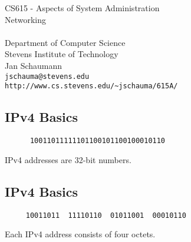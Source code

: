 \documentclass[xga]{xdvislides}
\begin{document}
\setfontphv

\lhead{\slidetitle}                               %
\cfoot{\relax}                               %
\rfoot{\Gray{\today}}

\vspace*{\fill}
\begin{center}
	\Hugesize
		CS615 - Aspects of System Administration\\ [1em]
		Networking\\ [1em]
	\hspace*{5mm}\blueline\\ [1em]
	\Normalsize
		Department of Computer Science\\
		Stevens Institute of Technology\\
		Jan Schaumann\\
		\verb+jschauma@stevens.edu+\\
		\verb+http://www.cs.stevens.edu/~jschauma/615A/+
\end{center}
\vspace*{\fill}

\subsection{IPv4 Basics}
\vspace{.5in}
\Hugesize
\begin{center}
\begin{verbatim}
      10011011111101100101100100010110
\end{verbatim}
\vspace{.5in}
IPv4 addresses are 32-bit numbers.
\end{center}
\Normalsize

\subsection{IPv4 Basics}
\vspace{.5in}
\Hugesize
\begin{center}
\begin{verbatim}
     10011011  11110110  01011001  00010110
\end{verbatim}
\vspace{.5in}
Each IPv4 address consists of four octets.
\end{center}
\Normalsize
\end{document}
